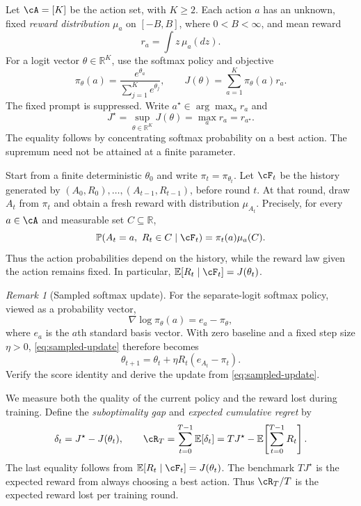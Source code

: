 \documentclass[11pt,twoside]{article}
\newcommand{\E}{\mathbb E}
\renewcommand{\P}{\mathbb P}
\newcommand{\R}{\mathbb R}
\theoremstyle{definition}
\theoremstyle{remark}
\newtheorem{remark}[theorem]{Remark}
\begin{document}
Let $\cA=[K]$ be the action set, with $K\ge2$. Each action $a$ has an
unknown, fixed \emph{reward distribution} $\mu_a$ on $[-B,B]$, where
$0<B<\infty$, and mean reward
\[
 r_a=\int z\,\mu_a(dz).
\]
For a logit vector $\theta\in\R^K$, use the softmax policy and objective
\[
 \pi_\theta(a)=\frac{e^{\theta_a}}{\sum_{j=1}^K e^{\theta_j}},
 \qquad J(\theta)=\sum_{a=1}^K\pi_\theta(a)r_a.
\]
The fixed prompt is suppressed. Write $a^\star\in\arg\max_a r_a$ and
\[
 J^\star=\sup_{\theta\in\R^K}J(\theta)=\max_a r_a=r_{a^\star}.
\]
The equality follows by concentrating softmax probability on a best
action. The supremum need not be attained at a finite parameter.

Start from a finite deterministic $\theta_0$ and write
$\pi_t=\pi_{\theta_t}$. Let $\cF_t$ be the history generated by
$(A_0,R_0),\ldots,(A_{t-1},R_{t-1})$, before round $t$. At that round,
draw $A_t$ from $\pi_t$ and obtain a fresh reward with distribution
$\mu_{A_t}$. Precisely, for every $a\in\cA$ and measurable set $C\subseteq\R$,
\begin{equation}
 \P(A_t=a,\ R_t\in C\mid\cF_t)=\pi_t(a)\mu_a(C).
 \label{eq:bandit-sampling}
\end{equation}
Thus the action probabilities depend on the history, while the reward law
given the action remains fixed. In particular,
$\E[R_t\mid\cF_t]=J(\theta_t)$.

\begin{remark}[Sampled softmax update]
\label{rem:sampled-softmax}
For the separate-logit softmax policy, viewed as a probability vector,
\[
 \nabla\log\pi_\theta(a)=e_a-\pi_\theta,
\]
where $e_a$ is the $a$th standard basis vector. With zero baseline and a
fixed step size $\eta>0$, \cref{eq:sampled-update} therefore becomes
\begin{equation}
 \theta_{t+1}=\theta_t+\eta R_t(e_{A_t}-\pi_t).
 \label{eq:vector-pg}
\end{equation}
Verify the score identity and derive the update from \cref{eq:sampled-update}.
\end{remark}

We measure both the quality of the current policy and the reward lost
during training. Define the \emph{suboptimality gap} and
\emph{expected cumulative regret}
by
\[
 \delta_t=J^\star-J(\theta_t),\qquad
 \cR_T=\sum_{t=0}^{T-1}\E[\delta_t]
       =TJ^\star-\E\!\left[\sum_{t=0}^{T-1}R_t\right].
\]
The last equality follows from $\E[R_t\mid\cF_t]=J(\theta_t)$.
The benchmark $TJ^\star$ is the expected reward from always choosing a
best action. Thus $\cR_T/T$ is the expected reward lost per training round.
\end{document}
